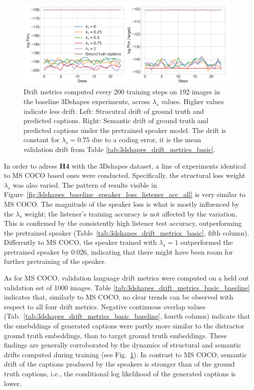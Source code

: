 \begin{figure}[h]
	\centering
	\includegraphics[width=\linewidth]{images/shapes_structural_semantic_drift_49_pure_L_s_all_random.png}
	\caption{Drift metrics computed every 200 training steps on 192 images in the baseline 3Dshapes experiments, across $\lambda_s$ values. Higher values indicate less drift. Left: Strucutral drift of ground truth and predicted captions. Right: Semantic drift of ground truth and predicted captions under the pretrained speaker model. The drift is constant for $\lambda_s = 0.75$ due to a coding error, it is the mean validation drift from Table \ref{tab:3dshapes_drift_metrics_basic}.} 
	\label{fig:3dshapes_baseline_all_str_sem_drift}
\end{figure}

In order to adress \textbf{H4} with the 3Dshapes dataset, a line of experiments identical to MS COCO based ones were conducted. Specifically, the structural loss weight $\lambda_s$ was also varied. The pattern of results visible in Figure~\ref{fig:3dshapes_baseline_speaker_loss_listener_acc_all} is very similar to MS COCO. The magnitude of the speaker loss is what is mostly influenced by the $\lambda_s$ weight; the listener's training accuracy is not affected by the variation. This is confirmed by the consistently high listener test accuracy, outperforming the pretrained speaker (Table~\ref{tab:3dshapes_drift_metrics_basic}, fifth column). Differently to MS COCO, the speaker trained with $\lambda_s = 1$ outperformed the pretrained speaker by 0.026, indicating that there might have been room for further pretraining of the speaker. 

As for MS COCO, validation language drift metrics were computed on a held out validation set of 1000 images. Table \ref{tab:3dshapes_drift_metrics_basic_baseline} indicates that, similarly to MS COCO, no clear trends can be observed with respect to all four drift metrics. Negative continuous overlap values (Tab.~\ref{tab:3dshapes_drift_metrics_basic_baseline}, fourth column) indicate that the emebddings of generated captions were partly more similar to the distractor ground truth embeddings, than to target ground truth embeddings. These findings are generally corroborated by the dynamics of structural and semantic drifts computed during training (see Fig.~\ref{fig:3dshapes_baseline_all_str_sem_drift}). In contrast to MS COCO, semantic drift of the captions produced by the speakers is stronger than of the ground truth captions, i.e., the conditional log likelihood of the generated captions is lower. 

